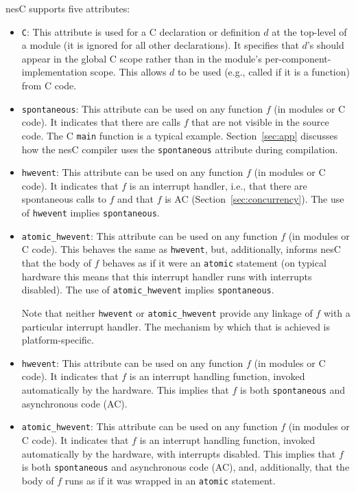 \documentclass[11pt,letterpaper]{article}
\newcommand{\kw}[1]{{\tt #1}}
\newcommand{\code}[1]{{\tt #1}}
\newcommand{\nesc}{nesC\xspace}
\begin{document}
\nesc supports five attributes:
\begin{itemize}
\item \code{C}: This attribute is used for a C declaration or definition
$d$ at the top-level of a module (it is ignored for all other
declarations). It specifies that $d$'s should appear in the global C scope
rather than in the module's per-component-implementation scope. This allows
$d$ to be used (e.g., called if it is a function) from C code.

\item \code{spontaneous}: This attribute can be used on any function $f$
(in modules or C code). It indicates that there are calls $f$ that are not
visible in the source code. The C \code{main} function is a typical
example. Section~\ref{sec:app} discusses how the \nesc compiler uses the
\code{spontaneous} attribute during compilation.

\item \code{hwevent}: This attribute can be used on any function $f$ (in
modules or C code). It indicates that $f$ is an interrupt handler, i.e.,
that there are spontaneous calls to $f$ and that $f$ is AC
(Section~\ref{sec:concurrency}). The use of \code{hwevent} implies
\code{spontaneous}.

\item \code{atomic\_hwevent}: This attribute can be used on any function
$f$ (in modules or C code). This behaves the same as \code{hwevent}, but,
additionally, informs \nesc that the body of $f$ behaves as if it were an
\kw{atomic} statement (on typical hardware this means that this interrupt
handler runs with interrupts disabled). The use of \code{atomic\_hwevent}
implies \code{spontaneous}.

Note that neither \code{hwevent} or \code{atomic\_hwevent} provide any
linkage of $f$ with a particular interrupt handler. The mechanism by
which that is achieved is platform-specific.

\item \code{hwevent}: This attribute can be used on any function
$f$ (in modules or C code). It indicates that $f$ is an interrupt
handling function, invoked automatically by the hardware. This implies
that $f$ is both \code{spontaneous} and asynchronous code (AC).

\item \code{atomic\_hwevent}: This attribute can be used on any function $f$
(in modules or C code). It indicates that $f$ is an interrupt handling
function, invoked automatically by the hardware, with interrupts
disabled. This implies that $f$ is both \code{spontaneous} and asynchronous
code (AC), and, additionally, that the body of $f$ runs as if it was
wrapped in an \code{atomic} statement.


\end{itemize}
\end{document}
